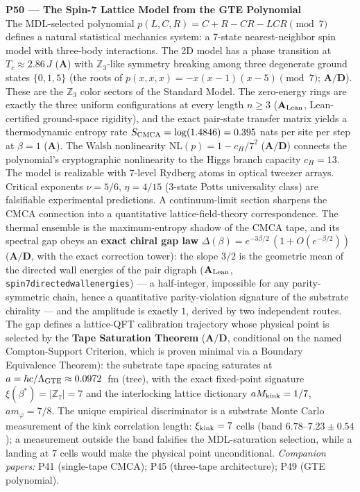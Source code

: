 \documentclass[11pt]{article}
\newcommand{\lean}[1]{%
  \penalty-100
  \begingroup\def\_{{\textunderscore\allowbreak}}\texttt{#1}\endgroup}
\newcommand{\CatAL}{\ensuremath{\textbf{A}_{\rm Lean}}}
\newcommand{\CatAD}{\textbf{A/D}}
\newcommand{\CatA}{\textbf{A}}
\begin{document}
\medskip
\noindent\textbf{P50 — The Spin-7 Lattice Model from the GTE Polynomial}~\cite{SpivackSpin7Lattice}\\
The MDL-selected polynomial $p(L,C,R) = C+R-CR-LCR \pmod{7}$ defines a natural
statistical mechanics system: a 7-state nearest-neighbor spin model with three-body
interactions. The 2D model has a phase transition at $T_c \approx 2.86\,J$ ($\CatA$) with
$\mathbb{Z}_3$-like symmetry breaking among three degenerate ground states $\{0,1,5\}$
(the roots of $p(x,x,x) = -x(x-1)(x-5) \pmod{7}$; $\CatAD$). These are the $\mathbb{Z}_3$
color sectors of the Standard Model. The zero-energy rings are exactly the three uniform
configurations at every length $n \ge 3$ ($\CatAL$, Lean-certified ground-space rigidity),
and the exact pair-state transfer matrix yields a thermodynamic entropy rate
$S_{\rm CMCA} = \log(1.4846) = 0.395$ nats per site per step at $\beta=1$ ($\CatA$). The Walsh nonlinearity $\mathrm{NL}(p) = 1 - c_H/7^2$ ($\CatAD$)
connects the polynomial's cryptographic nonlinearity to the Higgs branch capacity $c_H = 13$.
The model is realizable with 7-level Rydberg atoms in optical tweezer arrays. Critical
exponents $\nu = 5/6$, $\eta = 4/15$ (3-state Potts universality class) are falsifiable
experimental predictions.
A continuum-limit section sharpens the CMCA connection into a quantitative
lattice-field-theory correspondence.  The thermal ensemble is the maximum-entropy
shadow of the CMCA tape, and its spectral gap obeys an \textbf{exact chiral gap
law} $\Delta(\beta) = e^{-3\beta/2}\,(1 + O(e^{-\beta/2}))$ ($\CatAD$, with the
exact correction tower): the slope $3/2$ is the geometric mean of the directed
wall energies of the pair digraph ($\CatAL$,
\lean{spin7\_directed\_wall\_energies}) --- a half-integer, impossible for any
parity-symmetric chain, hence a quantitative parity-violation signature of the
substrate chirality --- and the amplitude is exactly $1$, derived by two
independent routes.  The gap defines a lattice-QFT calibration trajectory whose
physical point is selected by the \textbf{Tape Saturation Theorem} ($\CatAD$,
conditional on the named Compton-Support Criterion, which is proven minimal via
a Boundary Equivalence Theorem): the substrate tape spacing saturates at
$a = \hbar c/\Lambda_{\rm GTE} \approx 0.0972$~fm (tree), with the exact
fixed-point signature $\xi(\beta^*) = |\mathbb{Z}_7| = 7$ and the interlocking
lattice dictionary $aM_{\rm kink} = 1/7$, $am_\varphi = 7/8$.  The unique
empirical discriminator is a substrate Monte Carlo measurement of the kink
correlation length: $\xi_{\rm kink} = 7$ cells (band $6.78$--$7.23 \pm 0.54$);
a measurement outside the band falsifies the MDL-saturation selection, while a
landing at $7$ cells would make the physical point unconditional.
\emph{Companion papers:} P41 (single-tape CMCA); P45 (three-tape architecture); P49 (GTE polynomial).
\end{document}
